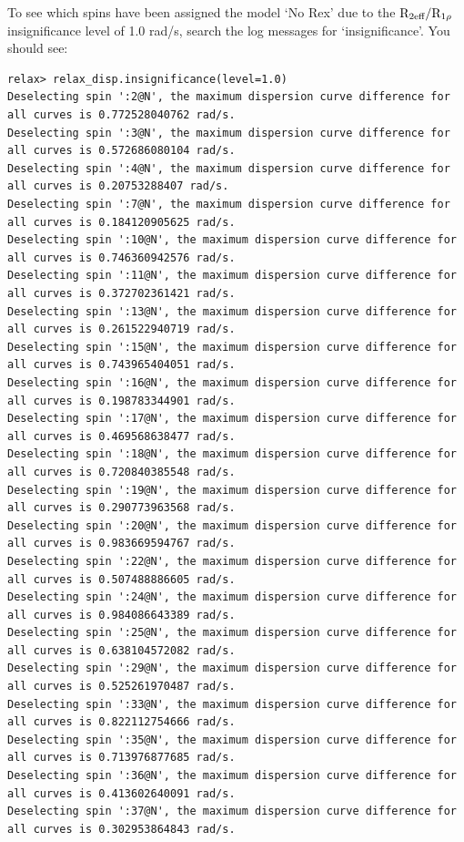 To see which spins have been assigned the model `No Rex' due to the $\mathrm{R}_\textrm{2eff}/\mathrm{R}_{1\rho}$ insignificance level of 1.0 rad/s, search the log messages for `insignificance'.
You should see:

\begin{lstlisting}[basicstyle=\ttfamily \tiny,language=relax_log,numbers=none]
relax> relax_disp.insignificance(level=1.0)
Deselecting spin ':2@N', the maximum dispersion curve difference for all curves is 0.772528040762 rad/s.
Deselecting spin ':3@N', the maximum dispersion curve difference for all curves is 0.572686080104 rad/s.
Deselecting spin ':4@N', the maximum dispersion curve difference for all curves is 0.20753288407 rad/s.
Deselecting spin ':7@N', the maximum dispersion curve difference for all curves is 0.184120905625 rad/s.
Deselecting spin ':10@N', the maximum dispersion curve difference for all curves is 0.746360942576 rad/s.
Deselecting spin ':11@N', the maximum dispersion curve difference for all curves is 0.372702361421 rad/s.
Deselecting spin ':13@N', the maximum dispersion curve difference for all curves is 0.261522940719 rad/s.
Deselecting spin ':15@N', the maximum dispersion curve difference for all curves is 0.743965404051 rad/s.
Deselecting spin ':16@N', the maximum dispersion curve difference for all curves is 0.198783344901 rad/s.
Deselecting spin ':17@N', the maximum dispersion curve difference for all curves is 0.469568638477 rad/s.
Deselecting spin ':18@N', the maximum dispersion curve difference for all curves is 0.720840385548 rad/s.
Deselecting spin ':19@N', the maximum dispersion curve difference for all curves is 0.290773963568 rad/s.
Deselecting spin ':20@N', the maximum dispersion curve difference for all curves is 0.983669594767 rad/s.
Deselecting spin ':22@N', the maximum dispersion curve difference for all curves is 0.507488886605 rad/s.
Deselecting spin ':24@N', the maximum dispersion curve difference for all curves is 0.984086643389 rad/s.
Deselecting spin ':25@N', the maximum dispersion curve difference for all curves is 0.638104572082 rad/s.
Deselecting spin ':29@N', the maximum dispersion curve difference for all curves is 0.525261970487 rad/s.
Deselecting spin ':33@N', the maximum dispersion curve difference for all curves is 0.822112754666 rad/s.
Deselecting spin ':35@N', the maximum dispersion curve difference for all curves is 0.713976877685 rad/s.
Deselecting spin ':36@N', the maximum dispersion curve difference for all curves is 0.413602640091 rad/s.
Deselecting spin ':37@N', the maximum dispersion curve difference for all curves is 0.302953864843 rad/s.

\end{lstlisting}
